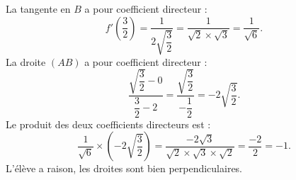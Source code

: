 \documentclass[10pt]{article}
\begin{document}
La tangente en \(B\) a pour coefficient directeur :
\[
f'\left( \dfrac{3}{2} \right) = \dfrac{1}{2 \sqrt{\dfrac{3}{2}}} = \dfrac{1}{\sqrt{2} \times \sqrt{3}} = \dfrac{1}{\sqrt{6}}.
\]
La droite \((AB)\) a pour coefficient directeur :
\[
\dfrac{\sqrt{\dfrac{3}{2}} - 0}{\dfrac{3}{2} - 2} = \dfrac{\sqrt{\dfrac{3}{2}}}{-\dfrac{1}{2}} = -2 \sqrt{\dfrac{3}{2}}.
\]
Le produit des deux coefficients directeurs est :
\[
\dfrac{1}{\sqrt{6}} \times \left( -2 \sqrt{\dfrac{3}{2}} \right) = \dfrac{-2\sqrt{3}}{\sqrt{2} \times \sqrt{3} \times \sqrt{2}} = \dfrac{-2}{2} = -1.
\]
L'élève a raison, les droites sont bien perpendiculaires.
\end{document}
